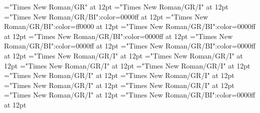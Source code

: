\documentclass[a4paper]{article}
\begin{document}
\pagestyle{plain}
\sloppy
\setlength{\parfillskip}{0pt plus 1fil}
\font\sectionletter="Times New Roman/GR" at 12pt
\font\articlesectionletter="Times New Roman/GR/I" at 12pt
\font\sensearticlesectionletter="Times New Roman/GR/BI":color=0000ff at 12pt
\font\sensebeforearticlesectionletter="Times New Roman/GR/BI":color=ff0000 at 12pt
\font\firstoftypegrammarcategorylastoftypesensearticlesectionletter="Times New Roman/GR/BI":color=0000ff at 12pt
\font{}="Times New Roman/GR/BI":color=0000ff at 12pt
\font\firstoftypelastoftypewordusedefinitionfirstoftypelastoftypesensearticlesectionletter="Times New Roman/GR/BI":color=0000ff at 12pt
\font\examplesensearticlesectionletter="Times New Roman/GR/BI":color=0000ff at 12pt
\font\firstoftypelastoftypesubentryarticlesectionletter="Times New Roman/GR/I" at 12pt
\font\firstoftypeheadwordlastoftypefirstoftypelastoftypesubentryarticlesectionletter="Times New Roman/GR/I" at 12pt
\font\examplefirstoftypelastoftypesubentryarticlesectionletter="Times New Roman/GR/I" at 12pt
\font\firstoftypeheadwordlastoftypearticlesectionletter="Times New Roman/GR/I" at 12pt
\font\firstoftypelastoftypepronunciationarticlesectionletter="Times New Roman/GR/I" at 12pt
\font\firstoftypelastoftypestressfirstoftypelastoftypepronunciationarticlesectionletter="Times New Roman/GR/I" at 12pt
\font\firstoftypevariantinflectionarticlesectionletter="Times New Roman/GR/I" at 12pt
\font\variantinflectionarticlesectionletter="Times New Roman/GR/I" at 12pt
\font\lastoftypevariantinflectionarticlesectionletter="Times New Roman/GR/I" at 12pt
\font\exampleusefirstoftypelastoftypesensearticlesectionletter="Times New Roman/GR/BI":color=0000ff at 12pt

\mbox{} 
\newpage 
\newpage 
\setcounter{page}{1} 
\pagestyle{fancy} 
\end{document}
